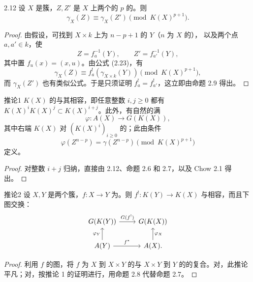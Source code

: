 \begin{SGAresult}{}{2.12}
设 $X$ 是簇，$Z,Z'$ 是 $X$ 上两个的 $p$ 的。则
\[
\gamma_X(Z)\equiv\gamma_X(Z')\pmod {K(X)^{p+1}}.\tag{2.33}
\]
\end{SGAresult}
\begin{proof}
由假设，可找到 $X\times k$ 上为 $n-p+1$ 的 $Y$（$n$ 为 $X$ 的），
以及两个点 $a,a'\in k$，使
\[
Z=f_a^{-1}(Y),\qquad Z'=f_{a'}^{-1}(Y),
\]
其中置 $f_u(x)=(x,u)$。由公式 (2.23)，有
\[
\gamma_X(Z)\equiv f_a^!(\gamma_{X\times k}(Y))\pmod {K(X)^{p+1}},
\]
而 $\gamma_X(Z')$ 也有类似公式。于是只须证明 $f_a^!=f_{a'}^!$，这立即由命题 2.9 得出。
\end{proof}
\begin{SGAresult}{推论}{1}
$K(X)$ 的与其相容，即任意整数 $i,j\geq0$ 都有 $K(X)^iK(X)^j\subset K(X)^{i+j}$。此外，有自然的满
\[
\varphi:A(X)\longrightarrow G(K(X)),\tag{2.34}
\]
其中右端 $K(X)$ 对 $(K(X)^i)_{i\geq0}$ 的；此由条件
\[
\varphi(Z^{n-p})=\gamma(Z^{n-p})\pmod {K(X)^{p+1}}
\]
定义。
\end{SGAresult}
\begin{proof}
对整数 $i+j$ 归纳，直接由 2.12、命题 2.6 和 2.7，以及 Chow  2.1 得出。
\end{proof}
\begin{SGAresult}{推论}{2}
设 $X,Y$ 是两个簇，$f:X\to Y$ 为。则 $f^!:K(Y)\to K(X)$ 与相容，而且下图交换：
\[
\begin{tikzcd}
G(K(Y))\arrow[r,"G(f^!)"]&G(K(X))\\
A(Y)\arrow[u,"\varphi_Y"]\arrow[r,"f^*"]&A(X)\arrow[u,"\varphi_X"'].
\end{tikzcd}
\]
\end{SGAresult}
\begin{proof}
利用 $f$ 的图，将 $f$ 为 $X$ 到 $X\times Y$ 的与 $X\times Y$ 到 $Y$ 的的复合。对，此推论平凡；对，按推论 1 的证明进行，用命题 2.8 代替命题 2.7。
\end{proof}

